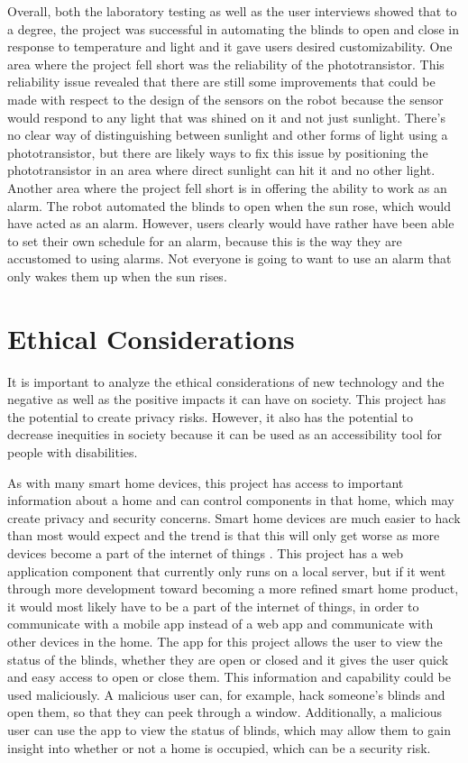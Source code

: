 \documentclass[10pt,twocolumn]{article}
\begin{document}
Overall, both the laboratory testing as well as the user interviews showed that to a degree, the project was successful in automating the blinds to open and close in response to temperature and light and it gave users desired customizability. One area where the project fell short was the reliability of the phototransistor. This reliability issue revealed that there are still some improvements that could be made with respect to the design of the sensors on the robot because the sensor would respond to any light that was shined on it and not just sunlight. There’s no clear way of distinguishing between sunlight and other forms of light using a phototransistor, but there are likely ways to fix this issue by positioning the phototransistor in an area where direct sunlight can hit it and no other light. Another area where the project fell short is in offering the ability to work as an alarm. The robot automated the blinds to open when the sun rose, which would have acted as an alarm. However, users clearly would have rather have been able to set their own schedule for an alarm, because this is the way they are accustomed to using alarms. Not everyone is going to want to use an alarm that only wakes them up when the sun rises. 

\section{Ethical Considerations}
It is important to analyze the ethical considerations of new technology and the negative as well as the positive impacts it can have on society. This project has the potential to create privacy risks. However, it also has the potential to decrease inequities in society because it can be used as an accessibility tool for people with disabilities.

As with many smart home devices, this project has access to important information about a home and can control components in that home, which may create privacy and security concerns. Smart home devices are much easier to hack than most would expect and the trend is that this will only get worse as more devices become a part of the internet of things \cite{Hunter2021Buggy}. This project has a web application component that currently only runs on a local server, but if it went through more development toward becoming a more refined smart home product, it would most likely have to be a part of the internet of things, in order to communicate with a mobile app instead of a web app and communicate with other devices in the home. The app for this project allows the user to view the status of the blinds, whether they are open or closed and it gives the user quick and easy access to open or close them. This information and capability could be used maliciously. A malicious user can, for example, hack someone’s blinds and open them, so that they can peek through a window. Additionally, a malicious user can use the app to view the status of blinds, which may allow them to gain insight into whether or not a home is occupied, which can be a security risk.
\end{document}
